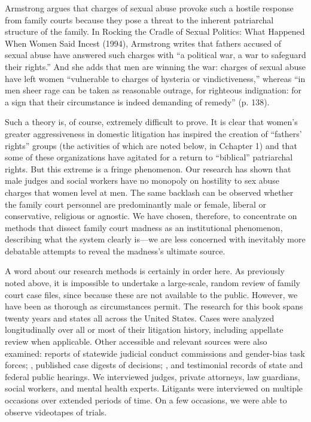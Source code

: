 Armstrong argues that charges of sexual abuse provoke such a hostile response from family courts because they pose a threat to the inherent patriarchal structure of the family. In Rocking the Cradle of Sexual Politics: What Happened When Women Said Incest (1994), Armstrong writes that fathers accused of sexual abuse have answered such charges with “a political war, a war to safeguard their rights.” And she adds that men are winning the war: charges of sexual abuse have left women “vulnerable to charges of hysteria or vindictiveness,” whereas “in men sheer rage can be taken as reasonable outrage, for righteous indignation: for a sign that their circumstance is indeed demanding of remedy” (p. 138). \pfl{}


Such a theory is, of course, extremely difficult to prove. It is clear that women’s greater aggressiveness in domestic litigation has inspired the creation of “fathers’ rights” groups (the activities of which are noted below, in Cchapter 1) and that some of these organizations have agitated for a return to “biblical” patriarchal rights. But this extreme is a fringe phenomenon. Our research has shown that male judges and social workers have no monopoly on hostility to sex abuse charges that women level at men. The same backlash can be observed whether the family court personnel are predominantly male or female, liberal or conservative, religious or agnostic. We have chosen, therefore, to concentrate on methods that dissect family court madness as an institutional phenomenon, describing what the system clearly is—we are less concerned with inevitably more debatable attempts to reveal the madness’s ultimate source. \pfl{}


A word about our research methods is certainly in order here. As previously noted above, it is impossible to undertake a large-scale, random review of family court case files, since because these are not available to the public. However, we have been as thorough as circumstances permit. The research for this book spans twenty years and states all across the United States. Cases were analyzed longitudinally over all or most of their litigation history, including appellate review when applicable. Other accessible and relevant sources were also examined: reports of statewide judicial conduct commissions and gender-bias task forces; , published case digests of decisions; , and testimonial records of state and federal public hearings. We interviewed judges, private attorneys, law guardians, social workers, and mental health experts. Litigants were interviewed on multiple occasions over extended periods of time. On a few occasions, we were able to observe videotapes of trials. \pfl{}


